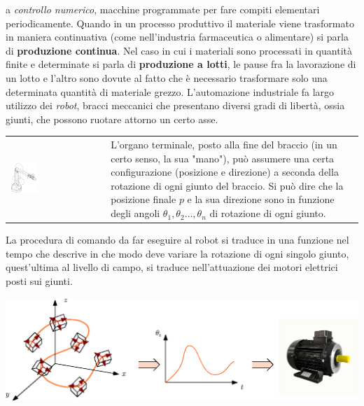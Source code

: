 \documentclass[10pt, letterpaper]{report}
\begin{document}
a \textit{controllo numerico}, macchine programmate per fare compiti elementari periodicamente. \acc 
Quando in un processo produttivo il materiale viene trasformato in maniera continuativa (come nell'industria 
farmaceutica o alimentare) si parla di \textbf{produzione continua}. Nel caso in cui i materiali sono processati 
in quantità finite e determinate si parla di \textbf{produzione a lotti}, le pause fra la lavorazione di un lotto 
e l'altro sono dovute al fatto 
che è necessario trasformare solo una determinata quantità di materiale grezzo.\acc 
L'automazione industriale fa largo utilizzo dei \textit{robot}, bracci meccanici che presentano diversi 
gradi di libertà, ossia giunti, che possono ruotare attorno un certo asse. 
   \begin{center}
	\begin{tabular}{>{\centering\arraybackslash}m{3in}>{\arraybackslash}m{3in}}
        \includegraphics[width=0.3\textwidth ]{images/braccioRobot.pdf} & L'organo terminale, posto alla fine 
        del braccio (in un certo senso, la sua "mano"), può assumere una certa configurazione (posizione e direzione) a 
        seconda della rotazione di ogni giunto del braccio. 
        Si può dire che la posizione finale $p$ e la sua direzione sono in funzione degli angoli 
        $\theta_1,\theta_2\dots,\theta_n$ di rotazione di ogni giunto.
		\\
	\end{tabular}
\end{center}
La procedura di comando da far eseguire al robot si traduce in una funzione nel tempo che descrive in che modo 
deve variare la rotazione di ogni singolo giunto, quest'ultima al livello di campo, si traduce nell'attuazione 
dei motori elettrici posti sui giunti.
\begin{center}
        \includegraphics[width=1\textwidth ]{images/rotBraccioRobot.eps}
\end{center}
\end{document}
